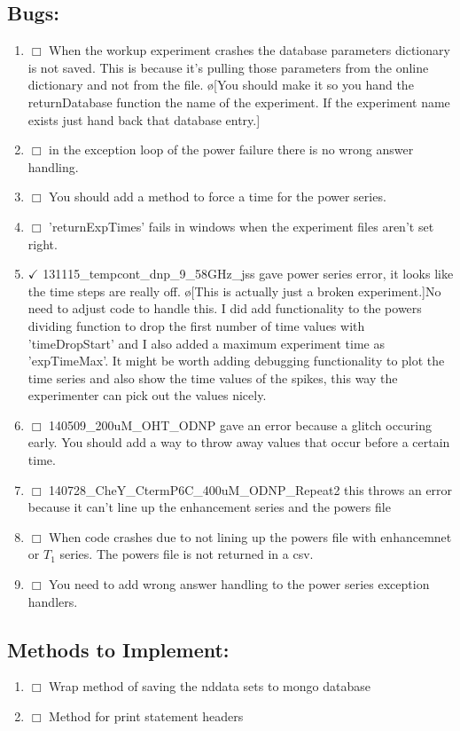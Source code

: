\documentclass[10pt]{book}
\begin{document}
\subsection{Bugs:}
\begin{enumerate}
    \item $\Box$ When the workup experiment crashes the database parameters dictionary is not saved. This is because it's pulling those parameters from the online dictionary and not from the file. \o[You should make it so you hand the returnDatabase function the name of the experiment. If the experiment name exists just hand back that database entry.]
    \item $\Box$ in the exception loop of the power failure there is no wrong answer handling.
    \item $\Box$ You should add a method to force a time for the power series.
    \item $\Box$ 'returnExpTimes' fails in windows when the experiment files aren't set right.
    \item $\checkmark$ 131115_tempcont_dnp_9_58GHz_jss gave power series error, it looks like the time steps are really off. \o[This is actually just a broken experiment.]{No need to adjust code to handle this. I did add functionality to the powers dividing function to drop the first number of time values with 'timeDropStart' and I also added a maximum experiment time as 'expTimeMax'. It might be worth adding debugging functionality to plot the time series and also show the time values of the spikes, this way the experimenter can pick out the values nicely.}
    \item $\Box$ 140509_200uM_OHT_ODNP gave an error because a glitch occuring early. You should add a way to throw away values that occur before a certain time.
    \item $\Box$ 140728_CheY_CtermP6C_400uM_ODNP_Repeat2 this throws an error because it can't line up the enhancement series and the powers file
    \item $\Box$ When code crashes due to not lining up the powers file with enhancemnet or $T_1$ series. The powers file is not returned in a csv.
    \item $\Box$ You need to add wrong answer handling to the power series exception handlers.
\end{enumerate}
\subsection{Methods to Implement:}
\begin{enumerate}
    \item $\Box$ Wrap method of saving the nddata sets to mongo database
    \item $\Box$ Method for print statement headers
\end{enumerate}
\end{document}
